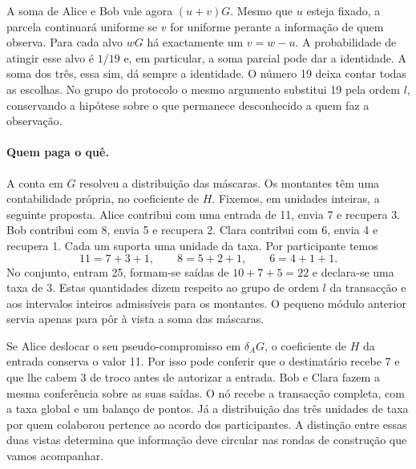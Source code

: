 A soma de Alice e Bob vale agora \((u+v)G\). Mesmo que \(u\) esteja
fixado, a parcela continuará uniforme se \(v\) for uniforme perante a
informação de quem observa. Para cada alvo \(wG\) há exactamente um
\(v=w-u\). A probabilidade de atingir esse alvo é \(1/19\) e,
em particular, a soma parcial pode dar a identidade. A soma dos três,
essa sim, dá sempre a identidade. O número 19 deixa contar todas
as escolhas. No grupo do protocolo o mesmo argumento substitui 19
pela ordem \(l\), conservando a hipótese sobre o que permanece
desconhecido a quem faz a observação.

\paragraph{Quem paga o quê.}
A conta em \(G\) resolveu a distribuição das máscaras. Os montantes
têm uma contabilidade própria, no coeficiente de \(H\). Fixemos,
em unidades inteiras, a seguinte proposta. Alice contribui com uma
entrada de 11, envia 7 e recupera 3. Bob contribui com 8, envia 5
e recupera 2. Clara contribui com 6, envia 4 e recupera 1. Cada
um suporta uma unidade da taxa. Por participante temos
\[
                 11=7+3+1,\qquad 8=5+2+1,\qquad 6=4+1+1 .
\]
No conjunto, entram 25, formam-se saídas de \(10+7+5=22\) e
declara-se uma taxa de 3. Estas quantidades dizem respeito ao grupo
de ordem \(l\) da transacção e aos intervalos inteiros admissíveis
para os montantes. O pequeno módulo anterior servia apenas para pôr
à vista a soma das máscaras.

Se Alice deslocar o seu pseudo-compromisso em \(\delta_A G\), o
coeficiente de \(H\) da entrada conserva o valor 11. Por isso pode
conferir que o destinatário recebe 7 e que lhe cabem 3 de troco antes
de autorizar a entrada. Bob e Clara fazem a mesma conferência sobre as
suas saídas. O nó recebe a transacção completa, com a taxa global e
um balanço de pontos. Já a distribuição das três unidades de taxa por
quem colaborou pertence ao acordo dos participantes. A distinção entre
essas duas vistas determina que informação deve circular nas rondas
de construção que vamos acompanhar.
